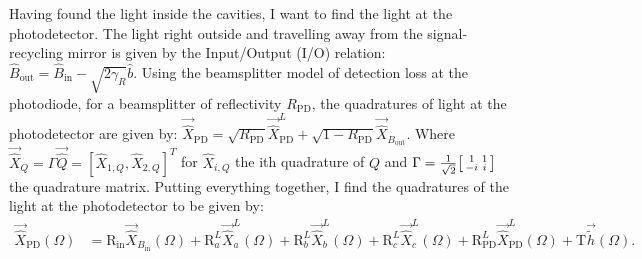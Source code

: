 Having found the light inside the cavities, I want to find the light at the photodetector. The light right outside and travelling away from the signal-recycling mirror is given by the Input/Output (I/O) relation: $\hat{B}_\mathrm{out}=\hat{B}_\mathrm{in}-\sqrt{2\gamma_R}\hat{b}$. Using the beamsplitter model of detection loss at the photodiode, for a beamsplitter of reflectivity $R_\mathrm{PD}$, the quadratures of light at the photodetector are given by: $\vec{\hat{X}}_\mathrm{PD}=\sqrt{R_\mathrm{PD}} \vec{\hat{X}}_\mathrm{PD}^L + \sqrt{1-R_\mathrm{PD}} \vec{\hat{X}}_{B_\mathrm{out}}$. Where $\vec{\hat{X}}_Q=\Gamma \vec{\hat{Q}}=[\hat{X}_{1,Q},\hat{X}_{2,Q}]^T$ for $\hat{X}_{i,Q}$ the ith quadrature of $Q$ and $\Gamma=\frac{1}{\sqrt{2}}\begin{bsmallmatrix}
1 & 1 \\ 
-i & i\end{bsmallmatrix}$ the quadrature matrix.
Putting everything together, I find the quadratures of the light at the photodetector to be given by:
\begin{align}
\vec{\hat{X}}_\mathrm{PD}(\Omega)&=
\mathrm{R_{in}}\vec{\hat{X}}_{B_\mathrm{in}}(\Omega)
+ \mathrm{R}^L_a\vec{\hat{X}}^L_a(\Omega)
+ \mathrm{R}^L_b\vec{\hat{X}}^L_b(\Omega)
+ \mathrm{R}^L_c\vec{\hat{X}}^L_c(\Omega)
+ \mathrm{R}^L_\mathrm{PD}\vec{\hat{X}}_\mathrm{PD}^L(\Omega)
+ \mathrm{T}\vec{\tilde{h}}(\Omega).
\end{align}

